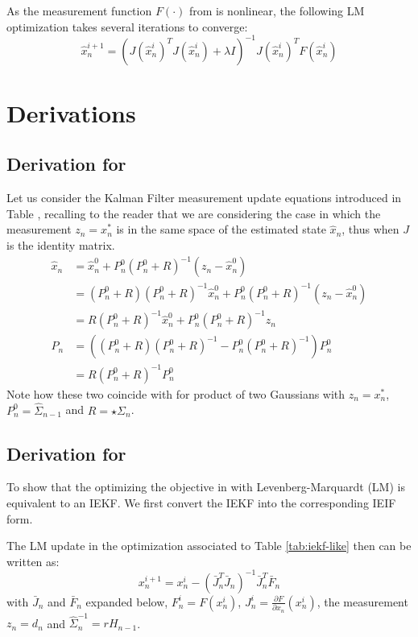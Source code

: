 \begin{DRAFT}
As the measurement function $F(\cdot)$ from  is nonlinear, the following LM optimization takes several iterations to converge:
\begin{equation}
\hat{x}_n^{i + 1} = (J(\hat{x}_n^i) ^T J(\hat{x}_n^i) + \lambda I)^{-1} J(\hat{x}_n^i)^T F(\hat{x}_n^i)
\end{equation}    
\end{DRAFT}

\section{Derivations}

\subsection{Derivation for }
\label{app:proof-kalman}
Let us consider the Kalman Filter measurement update equations introduced in Table , recalling to the reader that we are considering the case in which the measurement $z_n = x_n^*$ is in the same space of the estimated state $\hat{x}_n$, thus when $J$ is the identity matrix.
% 
\begin{align*}
\hat{x}_n 
&= \hat{x}_n^0 + P_n^0  (P_n^0 + R)^{-1}(z_n - \hat{x}_n^0) \\
&= (P_n^0 + R)(P_n^0 + R)^{-1}\hat{x}_n^0 + P_n^0  (P_n^0 + R)^{-1}(z_n - \hat{x}_n^0) \\
&= R(P_n^0 + R)^{-1}\hat{x}_n^0 + P_n^0  (P_n^0 + R)^{-1}z_n \\
% 
% 
P_n &= ((P_n^0 + R) (P_n^0 + R)^{-1} - P_n^0  (P_n^0 + R)^{-1}) P_n^0\\
&= R (P_n^0 + R)^{-1} P_n^0
\end{align*}
% 
Note how these two coincide with  for product of two Gaussians  with $z_n = x_n^*$, $P_n^0 = \hat{\Sigma}_{n - 1}$ and $R = \star\Sigma_{n}$.

\subsection{Derivation for }
\label{app:ieif-lm}
%
To show that the optimizing the objective in  with Levenberg-Marquardt (LM) is equivalent to an IEKF. We first convert the IEKF into the corresponding IEIF form.



The LM update in the optimization associated to Table \ref{tab:iekf-like} then can be written as:
% 
\begin{equation}
    x_n^{i + 1}= x_n^{i} - (\bar{J}_n^T \bar{J}_n)^{-1} \bar{J}_n^T \bar{F}_n 
\end{equation}
 with $\bar{J}_n$ and $\bar{F}_n$ expanded below, $F_n^i = F(x_n^i)$, 
 $J_n^i = \frac{\partial F}{\partial x_n}(x_n^i)$, the measurement $z_n = d_n$ and $\hat{\Sigma}_n^{-1} = r H_{n - 1}$. 
 
